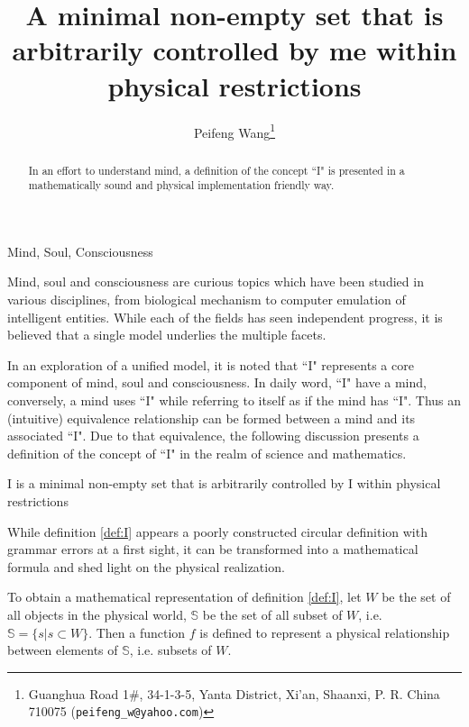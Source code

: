 \documentclass[final,leqno]{siamltex}
\title{A minimal non-empty set that is arbitrarily controlled by me within physical restrictions}
\author{Peifeng Wang\thanks{Guanghua Road 1\#, 34-1-3-5, Yanta District, Xi'an, Shaanxi, P. R. China 710075 ({\tt peifeng\_w@yahoo.com})}}
\begin{document}
\maketitle

\begin{abstract}
In an effort to understand mind, a definition of the concept ``I" is presented in a mathematically sound and physical implementation friendly way.
\end{abstract}

\begin{keywords} 
Mind, Soul, Consciousness
\end{keywords}



\pagestyle{myheadings}
\thispagestyle{plain}
\markboth{}{}

Mind, soul and consciousness are curious topics which have been studied in various disciplines, from biological mechanism to computer emulation of intelligent entities. While each of the fields has seen independent progress, it is believed that a single model underlies the multiple facets.

In an exploration of a unified model, it is noted that ``I" represents a core component of mind, soul and consciousness. In daily word, ``I" have a mind, conversely, a mind uses ``I" while referring to itself as if the mind has ``I". Thus an (intuitive) equivalence relationship can be formed between a mind and its associated ``I"\cite{intuition}. Due to that equivalence, the following discussion presents a definition of the concept of ``I" in the realm of science and mathematics.

\begin{definition} 
\label{def:I}
I is a minimal non-empty set that is arbitrarily controlled by I within physical restrictions
\end{definition}

While definition \ref{def:I} appears a poorly constructed circular definition with grammar errors at a first sight, it can be transformed into a mathematical formula and shed light on the physical realization.

To obtain a mathematical representation of definition \ref{def:I}, let $W$ be the set of all objects in the physical world, $\mathbb{S}$ be the set of all subset of $W$, i.e. $\mathbb{S}=\{s|s\subset W\}$. Then a function $f$ is defined to represent a physical relationship between elements of $\mathbb{S}$, i.e. subsets of $W$.
\end{document}
